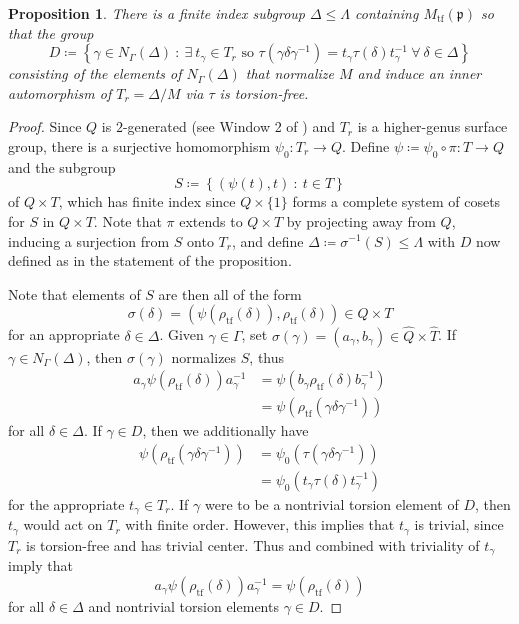 \documentclass[11pt]{article}
\theoremstyle{plain}
\newtheorem{prop}[thm]{Proposition}
\theoremstyle{definition}
\theoremstyle{remark}
\newcommand{\frakp}{\mathfrak{p}}
\newcommand{\gam}{\gamma}
\newcommand{\Gam}{\Gamma}
\newcommand{\de}{\delta}
\newcommand{\Del}{\Delta}
\newcommand{\Lam}{\Lambda}
\newcommand{\sig}{\sigma}
\newcommand{\wh}{\widehat}
\newenvironment{pf}{\begin{proof}}{\end{proof}}
\begin{document}
\begin{prop}\label{prop:FindD}
There is a finite index subgroup $\Del \le \Lam$ containing $M_{\mathrm{tf}}(\frakp)$ so that the group
\begin{equation}\label{eq:DDef}
D \coloneqq\!\left\{\gam \in N_\Gam(\Del)\ :\ \exists\ t_\gam \in T_r \textrm{ so } \tau(\gam \de \gam^{-1}) = t_\gam \tau (\de) t_\gam^{-1}\ \forall\ \de \in \Del \right\}
\end{equation}
consisting of the elements of $N_\Gam(\Del)$ that normalize $M$ and induce an inner automorphism of $T_r = \Del / M$ via $\tau$ is torsion-free.
\end{prop}
\begin{pf}
Since $Q$ is $2$-generated (see Window 2 of \cite{LubotzkySegal}) and $T_r$ is a higher-genus surface group, there is a surjective homomorphism $\psi_0 : T_r \to Q$. Define $\psi \coloneqq \psi_0 \circ \pi : T \to Q$ and the subgroup
\begin{equation}\label{eq:SDef}
S \coloneqq\!\left\{(\psi(t), t)\ :\ t \in T\right\}
\end{equation}
of $Q \times T$, which has finite index since $Q \times \{1\}$ forms a complete system of cosets for $S$ in $Q \times T$. Note that $\pi$ extends to $Q \times T$ by projecting away from $Q$, inducing a surjection from $S$ onto $T_r$, and define $\Del \coloneqq \sig^{-1}(S) \le \Lam$ with $D$ now defined as in the statement of the proposition.

Note that elements of $S$ are then all of the form
\begin{equation}\label{eq:Selts}
\sig(\de) = (\psi(\rho_{\mathrm{tf}}(\de)), \rho_{\mathrm{tf}}(\de)) \in Q \times T
\end{equation}
for an appropriate $\de \in \Del$. Given $\gam \in \Gam$, set $\sig(\gam) = (a_\gam, b_\gam) \in \wh{Q} \times \wh{T}$. If $\gam \in N_\Gam(\Del)$, then $\sig(\gam)$ normalizes $S$, thus
\begin{align}
a_\gam \psi(\rho_{\mathrm{tf}}(\de)) a_\gam^{-1} &= \psi(b_\gam \rho_{\mathrm{tf}}(\de) b_\gam^{-1}) \nonumber \\
&= \psi(\rho_{\mathrm{tf}}(\gam \de \gam^{-1})) \label{eq:1stConj}
\end{align}
for all $\de \in \Del$. If $\gam \in D$, then we additionally have
\begin{align}
\psi(\rho_{\mathrm{tf}}(\gam \de \gam^{-1})) &= \psi_0( \tau(\gam \de \gam^{-1})) \nonumber \\
&= \psi_0(t_\gam \tau(\de) t_\gam^{-1}) \label{eq:2ndConj}
\end{align}
for the appropriate $t_\gam \in T_r$. If $\gam$ were to be a nontrivial torsion element of $D$, then $t_\gam$ would act on $T_r$ with finite order. However, this implies that $t_\gam$ is trivial, since $T_r$ is torsion-free and has trivial center. Thus  and  combined with triviality of $t_\gam$ imply that
\begin{equation}\label{eq:Dtf}
a_\gam \psi(\rho_{\mathrm{tf}}(\de)) a_\gam^{-1} = \psi(\rho_{\mathrm{tf}}(\de))
\end{equation}
for all $\de \in \Del$ and nontrivial torsion elements $\gam \in D$.


\end{pf}
\end{document}
